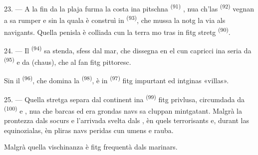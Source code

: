 23. --- A la fin da la plaja furma la costa ina pitschna 
\textsuperscript{(91)} , nua ch'las 
\textsuperscript{(92)} vegnan a sa rumper e sin la quala è construì in 
\textsuperscript{(93)}, che mussa la notg la via als navigants. Quella penisla è colliada
cun la terra mo tras in  fitg stretg \textsuperscript{(90)}.

\VUsaut{3.0mm}
\VUsaut{3.0mm}

24. --- Il  \textsuperscript{(94)} sa stenda, sfess dal mar, che
dissegna en el cun capricci ina seria da  \textsuperscript{(95)} e da
 (chaus), che al fan fitg pittoresc.

Sin il  \textsuperscript{(96)}, che domina la 
\textsuperscript{(98)}, è in  \textsuperscript{(97)} fitg impurtant ed intginas
«villas».

25. --- Quella stretga separa dal continent ina  \textsuperscript{(99)} fitg
privlusa, circumdada da  \textsuperscript{(100)} e , nua che
barcas ed era grondas navs sa cluppan mintgatant. Malgrà la prontezza dals socurs e
l'arrivada svelta dals , èn quels 
terrorisants e, durant las  equinozialas, èn pliras navs peridas cun
umens e rauba.

Malgrà quella vischinanza è  fitg frequentà dals marinars.

\VUsaut{6.0mm}
\VUfilet{22mm}
